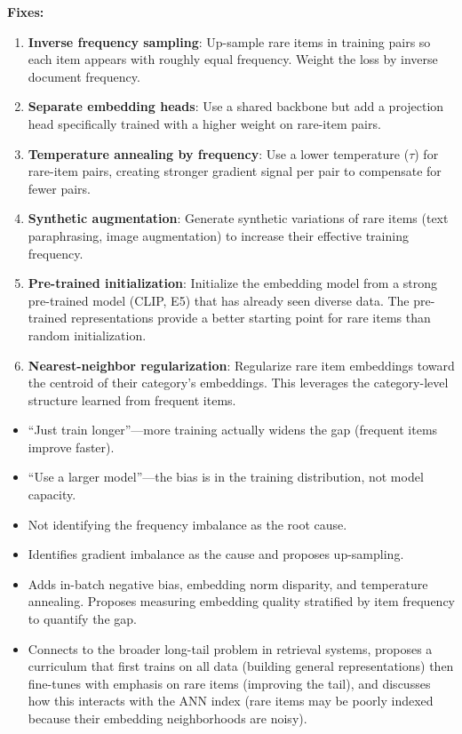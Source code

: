 \begin{interviewq}
\textbf{Fixes:}
\begin{enumerate}
    \item \textbf{Inverse frequency sampling}: Up-sample rare items in training pairs so each item appears with roughly equal frequency. Weight the loss by inverse document frequency.
    \item \textbf{Separate embedding heads}: Use a shared backbone but add a projection head specifically trained with a higher weight on rare-item pairs.
    \item \textbf{Temperature annealing by frequency}: Use a lower temperature ($\tau$) for rare-item pairs, creating stronger gradient signal per pair to compensate for fewer pairs.
    \item \textbf{Synthetic augmentation}: Generate synthetic variations of rare items (text paraphrasing, image augmentation) to increase their effective training frequency.
    \item \textbf{Pre-trained initialization}: Initialize the embedding model from a strong pre-trained model (CLIP, E5) that has already seen diverse data. The pre-trained representations provide a better starting point for rare items than random initialization.
    \item \textbf{Nearest-neighbor regularization}: Regularize rare item embeddings toward the centroid of their category's embeddings. This leverages the category-level structure learned from frequent items.
\end{enumerate}

\redflags
\begin{itemize}
    \item ``Just train longer''---more training actually widens the gap (frequent items improve faster).
    \item ``Use a larger model''---the bias is in the training distribution, not model capacity.
    \item Not identifying the frequency imbalance as the root cause.
\end{itemize}


\goodgreat
\begin{itemize}
    \item {} Identifies gradient imbalance as the cause and proposes up-sampling.
    \item {} Adds in-batch negative bias, embedding norm disparity, and temperature annealing. Proposes measuring embedding quality stratified by item frequency to quantify the gap.
    \item {} Connects to the broader long-tail problem in retrieval systems, proposes a curriculum that first trains on all data (building general representations) then fine-tunes with emphasis on rare items (improving the tail), and discusses how this interacts with the ANN index (rare items may be poorly indexed because their embedding neighborhoods are noisy).
\end{itemize}


\end{interviewq}
